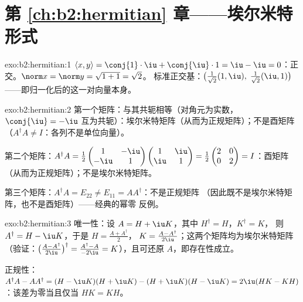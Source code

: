 \section*{第 \ref{ch:b2:hermitian} 章——埃尔米特形式}

\begin{solution}{exo:b2:hermitian:1}
$\langle x, y\rangle = \conj{1}\cdot\iu + \conj{\iu}\cdot 1 = \iu -
\iu = 0$：正交。$\norm x = \norm y = \sqrt{1 + 1} = \sqrt2$。
标准正交基：$\bigl(\frac{1}{\sqrt2}(1, \iu),\;
\frac{1}{\sqrt2}(\iu, 1)\bigr)$——即归一化后的这一对向量本身。
\end{solution}

\begin{solution}{exo:b2:hermitian:2}
第一个矩阵：与其共轭相等（对角元为实数，$\conj{\iu} =
-\iu$ 互为共轭）：埃尔米特矩阵（从而为正规矩阵）；不是酉矩阵（$A^\dagger A
\neq I$：各列不是单位向量）。

第二个矩阵：$A^\dagger A = \frac12\begin{pmatrix} 1 & -\iu\\ -\iu &
1\end{pmatrix}\begin{pmatrix} 1 & \iu\\ \iu & 1\end{pmatrix} =
\frac12\begin{pmatrix} 2 & 0\\ 0 & 2\end{pmatrix} = I$：酉矩阵
（从而为正规矩阵）；不是埃尔米特矩阵。

第三个矩阵：$A^\dagger A = E_{22} \neq E_{11} = AA^\dagger$：不是正规矩阵
（因此既不是埃尔米特矩阵，也不是酉矩阵）——经典的幂零
反例。
\end{solution}

\begin{solution}{exo:b2:hermitian:3}
唯一性：设 $A = H + \iu K$，其中 $H^\dagger = H$，$K^\dagger = K$，
则 $A^\dagger = H - \iu K$，于是 $H = \frac{A + A^\dagger}{2}$，
$K = \frac{A - A^\dagger}{2\iu}$；这两个矩阵均为埃尔米特矩阵
（验证：$\bigl(\frac{A - A^\dagger}{2\iu}\bigr)^\dagger = \frac{
A^\dagger - A}{-2\iu} = K$），且可还原 $A$，即存在性成立。

正规性：$A^\dagger A - AA^\dagger = (H - \iu K)(H + \iu K) - (H
+ \iu K)(H - \iu K) = 2\iu(HK - KH)$：该差为零当且仅当 $HK = KH$。
\end{solution}

